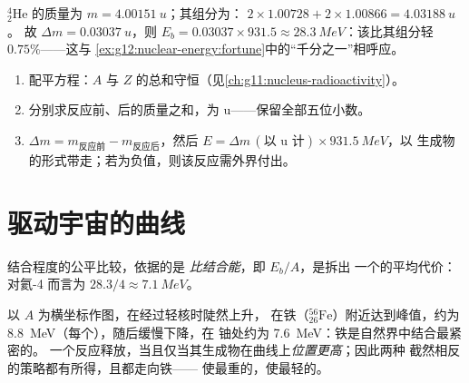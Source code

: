 \begin{example}[氦-4]\label{ex:g12:nuclear-energy:helium}
${}^{4}_{2}\mathrm{He}$ 的质量为 $m = \qty{4.00151}{u}$；其组分为：
$2 \times 1.00728 + 2 \times 1.00866 = \qty{4.03188}{u}$。
故 $\Delta m = \qty{0.03037}{u}$，则 $E_b = 0.03037 \times 931.5 \approx
\qty{28.3}{MeV}$：该比其组分轻 $0.75\%$——这与
\cref{ex:g12:nuclear-energy:fortune}中的“千分之一”相呼应。
\end{example}

\begin{method}[核反应的能量平衡]\label{met:g12:nuclear-energy:balance}
\begin{enumerate}
  \item 配平方程：$A$ 与 $Z$ 的总和守恒（见\cref{ch:g11:nucleus-radioactivity}）。
  \item 分别求反应前、后的质量之和，为 \unit{u}——保留全部五位小数。
  \item $\Delta m = m_{\text{反应前}} - m_{\text{反应后}}$，然后
        $E = \Delta m\,(\text{以 u 计}) \times \qty{931.5}{MeV}$，以
        生成物的形式带走；若为负值，则该反应需外界付出。
\end{enumerate}
\end{method}

\section{驱动宇宙的曲线}

\begin{definition}[比结合能]\label{def:g12:nuclear-energy:pernucleon}
结合程度的公平比较，依据的是
\emph{比结合能}，即 $E_b/A$，是拆出
一个的平均代价：对氦-4 而言为 $28.3/4 \approx \qty{7.1}{MeV}$。
\end{definition}

\begin{proposition}[铁峰与两条下行之路]\label{prop:g12:nuclear-energy:ironpeak}
以 $A$ 为横坐标作图，在经过轻核时陡然上升，
在铁（${}^{56}_{26}\mathrm{Fe}$）附近达到峰值，约为
\qty{8.8}{MeV}（每个），随后缓慢下降，在
铀处约为 \qty{7.6}{MeV}：铁是自然界中结合最紧密的。
一个反应释放，当且仅当其生成物在曲线上\emph{位置更高}；因此两种
截然相反的策略都有所得，且都走向铁——
使最重的\emph{}，使最轻的\emph{}。
\end{proposition}
\admitted

